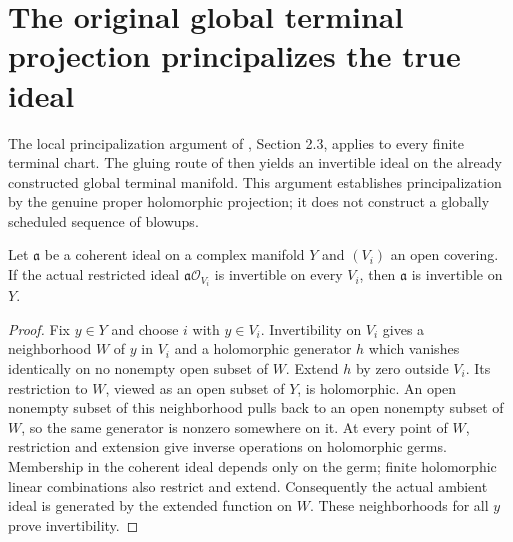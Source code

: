 \section{The original global terminal projection principalizes the true ideal}

The local principalization argument of \cite{wlodarczyk05-hironaka},
Section 2.3, applies to every finite terminal chart.  The gluing route of
\cite{bierstone-milman08-functoriality} then yields an invertible ideal on
the already constructed global terminal manifold.  This argument establishes
principalization by the genuine proper holomorphic projection; it does not
construct a globally scheduled sequence of blowups.

\begin{lemma}
\label{hir:invertibility-descends-actual-open-cover}
\leanok
{}
Let $\mathfrak a$ be a coherent ideal on a complex manifold $Y$ and
$(V_i)$ an open covering.  If the actual restricted ideal
$\mathfrak a\mathcal O_{V_i}$ is invertible on every $V_i$, then
$\mathfrak a$ is invertible on $Y$.
\end{lemma}
\begin{proof}
Fix $y\in Y$ and choose $i$ with $y\in V_i$.  Invertibility on $V_i$
gives a neighborhood $W$ of $y$ in $V_i$ and a holomorphic generator $h$
which vanishes identically on no nonempty open subset of $W$.  Extend $h$
by zero outside $V_i$.  Its restriction to $W$, viewed as an open subset
of $Y$, is holomorphic.  An open nonempty subset of this neighborhood
pulls back to an open nonempty subset of $W$, so the same generator is
nonzero somewhere on it.  At every point of $W$, restriction and extension
give inverse operations on holomorphic germs.  Membership in the coherent
ideal depends only on the germ; finite holomorphic linear combinations
also restrict and extend.  Consequently the actual ambient ideal is
generated by the extended function on $W$.  These neighborhoods for all
$y$ prove invertibility.
\end{proof}

